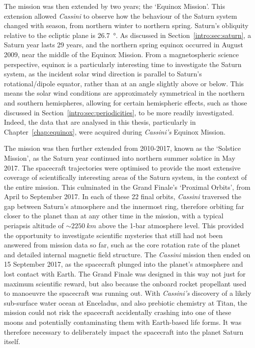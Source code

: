 The mission was then extended by two years; the `Equinox Mission'. This extension allowed \textit{Cassini} to observe how the behaviour of the Saturn system changed with season, from northern winter to northern spring. Saturn's obliquity relative to the ecliptic plane is \SI{26.7}{\degree}. As discussed in Section~\ref{intro:sec:saturn}, a Saturn year lasts 29 years, and the northern spring equinox occurred in August 2009, near the middle of the Equinox Mission. From a magnetospheric science perspective, equinox is a particularly interesting time to investigate the Saturn system, as the incident solar wind direction is parallel to Saturn's rotational/dipole equator, rather than at an angle slightly above or below. This means the solar wind conditions are approximately symmetrical in the northern and southern hemispheres, allowing for certain hemispheric effects, such as those discussed in Section~\ref{intro:sec:periodicities}, to be more readily investigated. Indeed, the data that are analysed in this thesis, particularly in Chapter~\ref{chap:equinox}, were acquired during \textit{Cassini's} Equinox Mission.

The mission was then further extended from 2010-2017, known as the `Solstice Mission', as the Saturn year continued into northern summer solstice in May 2017. The spacecraft trajectories were optimised to provide the most extensive coverage of scientifically interesting areas of the Saturn system, in the context of the entire mission. This culminated in the Grand Finale's `Proximal Orbits', from April to September 2017. In each of these 22 final orbits, \textit{Cassini} traversed the gap between Saturn's atmosphere and the innermost ring, therefore orbiting far closer to the planet than at any other time in the mission, with a typical periapsis altitude of ${\sim}\SI{2250}{km}$ above the 1-bar atmosphere level. This provided the opportunity to investigate scientific mysteries that still had not been answered from mission data so far, such as the core rotation rate of the planet and detailed internal magnetic field structure. The \textit{Cassini} mission then ended on 15 September 2017, as the spacecraft plunged into the planet's atmosphere and lost contact with Earth. The Grand Finale was designed in this way not just for maximum scientific reward, but also because the onboard rocket propellant used to manoeuvre the spacecraft was running out. With \textit{Cassini's} discovery of a likely sub-surface water ocean at Enceladus, and also prebiotic chemistry at Titan, the mission could not risk the spacecraft accidentally crashing into one of these moons and potentially contaminating them with Earth-based life forms. It was therefore necessary to deliberately impact the spacecraft into the planet Saturn itself.

